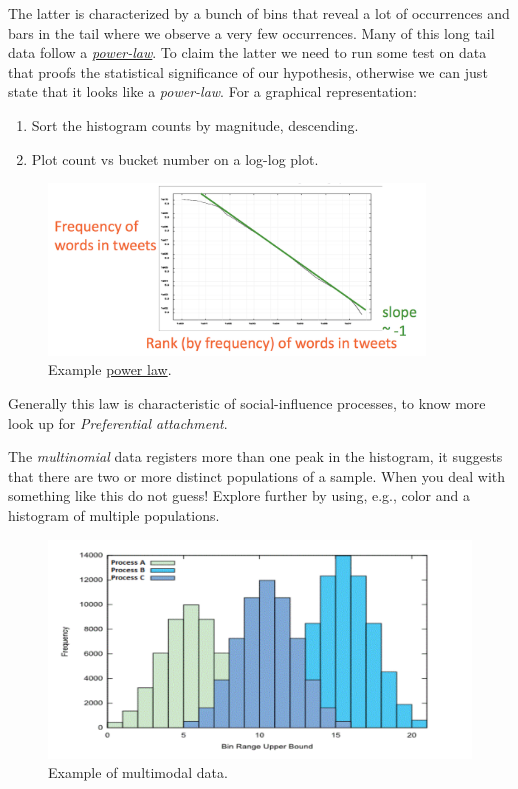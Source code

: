 The latter is characterized by a bunch of bins that reveal a lot of occurrences and bars in the tail where we observe a very few occurrences. Many of this long tail data follow a \href{https://en.wikipedia.org/wiki/Power\_law\#Power-law\_probability\_distributions}{\emph{power-law}}. To claim the latter we need to run some test on data that proofs the statistical significance of our hypothesis, otherwise we can just state that it looks like a \emph{power-law}. For a graphical representation:

\begin{enumerate}
\item Sort the histogram counts by magnitude, descending.
\item Plot count vs bucket number on a log-log plot.
\end{enumerate}


\begin{figure}[H]%
 \centering
 \includegraphics[width=10cm]{./img/06/power_law}
 \caption{\label{pic:power_law} Example \href{https://en.wikipedia.org/wiki/Zipf\%27s\_law}{power law}.}
\end{figure}


Generally this law is characteristic of social-influence processes, to know more look up for \emph{Preferential attachment}.

The \emph{multinomial} data registers more than one peak in the histogram, it suggests that there are two or more distinct populations of a sample. When you deal with something like this do not guess! Explore further by using, e.g., color and a histogram of multiple populations. 


\begin{figure}[H]%
 \centering
 \includegraphics[width=13cm]{./img/06/multimodal}
 \caption{\label{pic:multimodal} Example of multimodal data.}
\end{figure}


